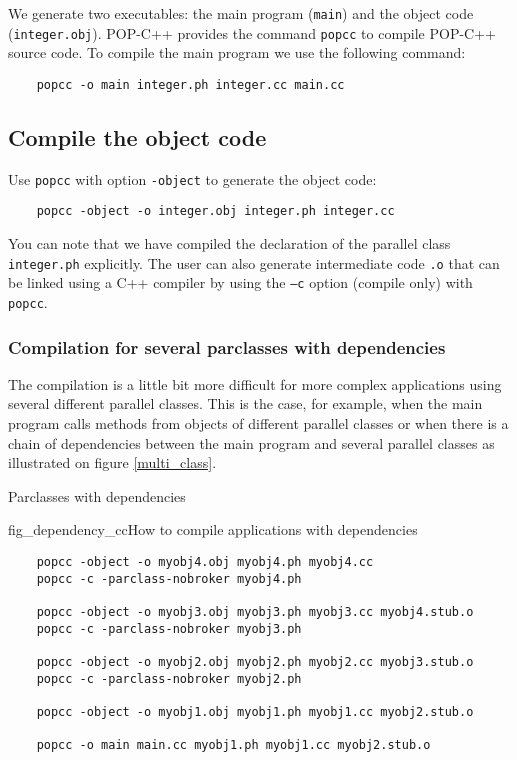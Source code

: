 We generate two executables: the main program (\texttt{main}) and the
object code (\texttt{integer.obj}). POP-C++ provides the command
\texttt{popcc} to compile POP-C++ source code. To compile the main
program we use the following command:

\vspace{3mm}
\begin{verbatim}
    popcc -o main integer.ph integer.cc main.cc
\end{verbatim}

\subsection{Compile the object code}

Use \texttt{popcc} with option \texttt{-object} to generate the object
code:

\vspace{4mm}
\begin{verbatim}
    popcc -object -o integer.obj integer.ph integer.cc
\end{verbatim}
\vspace{4mm}

You can note that we have compiled the declaration of the parallel class
\texttt{integer.ph} explicitly. The user can also generate intermediate
code \texttt{.o} that can be linked using a C++ compiler by using the \texttt{--c} option (compile only) with \texttt{popcc}.

\subsubsection{Compilation for several parclasses with dependencies}

The compilation is a little bit more difficult for more complex applications 
using several different parallel classes. This is the case, for example,
when the main program calls methods from objects of different parallel classes
or when there is a chain of dependencies between the main program and several
parallel classes as illustrated on figure \ref{multi_class}.

{Parclasses with dependencies}

\begin{figura}{fig_dependency_cc}{How to compile applications with dependencies}%
\vspace{-4mm}%
\begin{verbatim}
	popcc -object -o myobj4.obj myobj4.ph myobj4.cc
	popcc -c -parclass-nobroker myobj4.ph

	popcc -object -o myobj3.obj myobj3.ph myobj3.cc myobj4.stub.o
	popcc -c -parclass-nobroker myobj3.ph
	
	popcc -object -o myobj2.obj myobj2.ph myobj2.cc myobj3.stub.o
	popcc -c -parclass-nobroker myobj2.ph 

	popcc -object -o myobj1.obj myobj1.ph myobj1.cc myobj2.stub.o

	popcc -o main main.cc myobj1.ph myobj1.cc myobj2.stub.o
\end{verbatim}
\end{figura}

